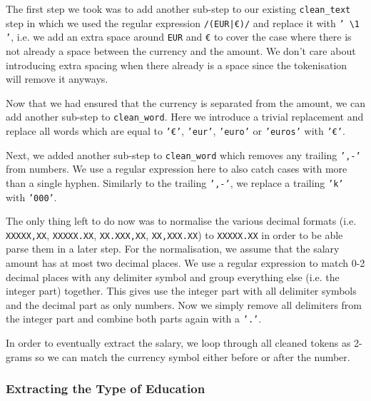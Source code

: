 \documentclass[runningheads]{llncs}
\begin{document}
The first step we took was to add another sub-step to our existing \texttt{clean\_text} step in which we used the regular expression \texttt{/(EUR|€)/} and replace it with \texttt{' \textbackslash1 '}, i.e. we add an extra space around \texttt{EUR} and \texttt{€} to cover the case where there is not already a space between the currency and the amount. We don't care about introducing extra spacing when there already is a space since the tokenisation will remove it anyways.

Now that we had ensured that the currency is separated from the amount, we can add another sub-step to \texttt{clean\_word}. Here we introduce a trivial replacement and replace all words which are equal to \texttt{'€'}, \texttt{'eur'}, \texttt{'euro'} or \texttt{'euros'} with \texttt{'€'}.

Next, we added another sub-step to \texttt{clean\_word} which removes any trailing \texttt{',-'} from numbers. We use a regular expression here to also catch cases with more than a single hyphen. Similarly to the trailing \texttt{',-'}, we replace a trailing \texttt{'k'} with \texttt{'000'}.

The only thing left to do now was to normalise the various decimal formats (i.e. \texttt{XXXXX,XX}, \texttt{XXXXX.XX}, \texttt{XX.XXX,XX}, \texttt{XX,XXX.XX}) to \texttt{XXXXX.XX} in order to be able parse them in a later step. For the normalisation, we assume that the salary amount has at most two decimal places. We use a regular expression to match 0-2 decimal places with any delimiter symbol and group everything else (i.e. the integer part) together. This gives use the integer part with all delimiter symbols and the decimal part as only numbers. Now we simply remove all delimiters from the integer part and combine both parts again with a \texttt{'.'}.

In order to eventually extract the salary, we loop through all cleaned tokens as 2-grams so we can match the currency symbol either before or after the number.

\subsubsection{Extracting the Type of Education}
\label{subsub:extracting_the_type_of_education}
\end{document}
